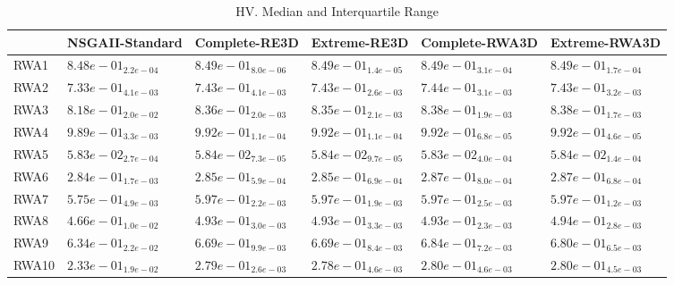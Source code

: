 \documentclass{article}
\begin{document}
\begin{table}
\caption{HV. Median and Interquartile Range}
\label{table: HV}
\centering
\begin{scriptsize}
\begin{tabular}{llllll}
\hline & NSGAII-Standard & Complete-RE3D & Extreme-RE3D & Complete-RWA3D &  Extreme-RWA3D\\
\hline 
RWA1 & $  8.48e-01_{ 2.2e-04}$ & \cellcolor{gray95}$  8.49e-01_{ 8.0e-06}$ & \cellcolor{gray25}$  8.49e-01_{ 1.4e-05}$ & $  8.49e-01_{ 3.1e-04}$ & $  8.49e-01_{ 1.7e-04}$ \\
RWA2 & $  7.33e-01_{ 4.1e-03}$ & $  7.43e-01_{ 4.1e-03}$ & $  7.43e-01_{ 2.6e-03}$ & \cellcolor{gray95}$  7.44e-01_{ 3.1e-03}$ & \cellcolor{gray25}$  7.43e-01_{ 3.2e-03}$ \\
RWA3 & $  8.18e-01_{ 2.0e-02}$ & $  8.36e-01_{ 2.0e-03}$ & $  8.35e-01_{ 2.1e-03}$ & \cellcolor{gray25}$  8.38e-01_{ 1.9e-03}$ & \cellcolor{gray95}$  8.38e-01_{ 1.7e-03}$ \\
RWA4 & $  9.89e-01_{ 3.3e-03}$ & $  9.92e-01_{ 1.1e-04}$ & $  9.92e-01_{ 1.1e-04}$ & \cellcolor{gray25}$  9.92e-01_{ 6.8e-05}$ & \cellcolor{gray95}$  9.92e-01_{ 4.6e-05}$ \\
RWA5 & $  5.83e-02_{ 2.7e-04}$ & \cellcolor{gray25}$  5.84e-02_{ 7.3e-05}$ & $  5.84e-02_{ 9.7e-05}$ & $  5.83e-02_{ 4.0e-04}$ & \cellcolor{gray95}$  5.84e-02_{ 1.4e-04}$ \\
RWA6 & $  2.84e-01_{ 1.7e-03}$ & $  2.85e-01_{ 5.9e-04}$ & $  2.85e-01_{ 6.9e-04}$ & \cellcolor{gray95}$  2.87e-01_{ 8.0e-04}$ & \cellcolor{gray25}$  2.87e-01_{ 6.8e-04}$ \\
RWA7 & $  5.75e-01_{ 4.9e-03}$ & $  5.97e-01_{ 2.2e-03}$ & \cellcolor{gray95}$  5.97e-01_{ 1.9e-03}$ & \cellcolor{gray25}$  5.97e-01_{ 2.5e-03}$ & $  5.97e-01_{ 1.2e-03}$ \\
RWA8 & $  4.66e-01_{ 1.0e-02}$ & $  4.93e-01_{ 3.0e-03}$ & $  4.93e-01_{ 3.3e-03}$ & \cellcolor{gray25}$  4.93e-01_{ 2.3e-03}$ & \cellcolor{gray95}$  4.94e-01_{ 2.8e-03}$ \\
RWA9 & $  6.34e-01_{ 2.2e-02}$ & $  6.69e-01_{ 9.9e-03}$ & $  6.69e-01_{ 8.4e-03}$ & \cellcolor{gray95}$  6.84e-01_{ 7.2e-03}$ & \cellcolor{gray25}$  6.80e-01_{ 6.5e-03}$ \\
RWA10 & $  2.33e-01_{ 1.9e-02}$ & $  2.79e-01_{ 2.6e-03}$ & $  2.78e-01_{ 4.6e-03}$ & \cellcolor{gray25}$  2.80e-01_{ 4.6e-03}$ & \cellcolor{gray95}$  2.80e-01_{ 4.5e-03}$ \\
\hline
\end{tabular}
\end{scriptsize}
\end{table}
\end{document}
